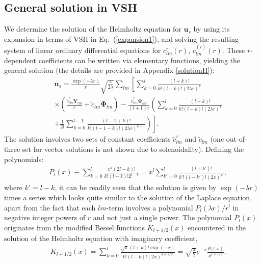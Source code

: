 \documentclass[aps,prx,twocolumn,amsmath,amssymb,amsfonts]{revtex4-2}
\begin{document}
\subsection{General solution in VSH} \label{ge}

We determine the solution of the Helmholtz equation for $\bm u_s$ by using its expansion in terms of VSH in Eq.~(\ref{expansion1}), and solving the resulting system of linear ordinary differential equations for $c^r_{lm}(r)$, $c^{(i)}_{lm}(r)$. These $r$-dependent coefficients can be written via elementary functions, yielding the general solution (the details are provided in Appendix \ref{solutionH}):
\begin{eqnarray}&&
\bm u_s\!=\!\frac{\exp(-\lambda r)}{r} \sqrt{\frac{\pi}{2\lambda}}\sum_{lm}\left[\sum_{k=0}^l \frac{(l+k)!}{k!(l-k)!(2\lambda r)^k}
\right.\nonumber\\&&\left.
\times \left(\frac{{\tilde c}^{r}_{lm}\bm Y_{lm}}{r}\!+\!{\tilde c}_{lm}\bm \Phi_{lm}\right)
\!-\!\frac{{\tilde c}^{r}_{lm} \bm \Psi_{lm}}{(l\!+\!1)r}\left(\sum_{k=0}^l \frac{(l\!+\!k)!}{k!(l\!-\!k)!(2\lambda r)^k}
\right.\right.\nonumber\\&&\left.\left.
+ \frac{1}{2l}\sum_{k=0}^{l-1} \frac{(l-1+k)!}{k!(l-1-k)!(2\lambda r)^{k-1}}\right)\right].\label{Helmel}
\end{eqnarray}
The solution involves two sets of constant coefficients ${\tilde c}^{r}_{lm}$ and ${\tilde c}_{lm}$ (one out-of-three set for vector solutions is not shown due to solenoidality). Defining the polynomials:
\begin{eqnarray}&&\!\!\!\!\!
P_l(x)\!\equiv \!
\sum_{k=0}^{l}\! \frac{x^k(2l\!-\!k)!}{k!(l\!-\!k)!2^{l-k}}=x^l\sum_{k'=0}^{l}\! \frac{(l\!+\!k')!}{k'!(l\!-\!k')!(2x)^{k'}},%
\label{ourp}
\end{eqnarray}
where $k'=l-k$, it can be readily seen that the solution is given by $\exp(-\lambda r)$ times a series which looks quite similar to the solution of the Laplace equation, apart from the fact that each $lm$-term involves a polynomial $P_l(\lambda r)/r^l$ in negative integer powers of $r$ and not just a single power. The polynomial $P_l(x)$ originates from the modified Bessel functions $K_{l+1/2}(x)$ encountered in the solution of the Helmholtz equation with imaginary coefficient,
\begin{eqnarray}&&\!\!\!\!\!\!\!\!
K_{l+1/2}(x)\!=\!\!\sum_{k=0}^l\! \frac{\sqrt{\pi}(l\!+\!k)!\exp(-x)}{k!(l\!-\!k)!(2x)^{k+1/2}}\!=\!\sqrt{\frac{\pi}{2}}e^{-x}\frac{P_l(x)}{x^{l+1/2}}. \label{mod}
\end{eqnarray}
\end{document}
